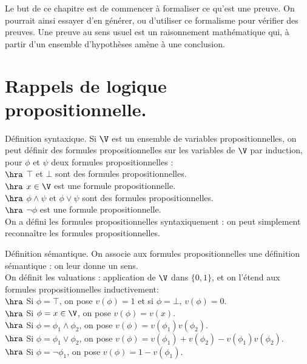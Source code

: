 \documentclass[french, 11pt]{article}
\begin{document}


Le but de ce chapitre est de commencer à formaliser ce qu'est une preuve. On pourrait ainsi essayer d'en générer, ou d'utiliser ce formalisme pour vérifier des preuves. Une preuve au sens usuel est un raisonnement mathématique qui, à partir d'un ensemble d'hypothèses amène à une conclusion. 

\section{Rappels de logique propositionnelle.}

\begin{rappel}{Définition syntaxique.}{}
    Si $\V$ est un ensemble de variables propositionnelles, on peut définir des formules propositionnelles sur les variables de $\V$ par induction, pour $\phi$ et $\psi$ deux formules propositionnelles :\\
    $\hra$ $\top$ et $\bot$ sont des formules propositionnelles.\\
    $\hra$ $x\in\V$ est une formule propositionnelle.\\
    $\hra$ $\phi \land \psi$ et $\phi \lor \psi$ sont des formules propositionnelles.\\
    $\hra$ $\lnot\phi$ est une formule propositionnelle.\\
    On a défini les formules propositionnelles syntaxiquement : on peut simplement reconnaître les formules propositionnelles.
\end{rappel}

\vspace*{-0.9cm}

\begin{rappel}{Définition sémantique.}{}
    On associe aux formules propositionnelles une définition sémantique : on leur donne un sens.\\
    On définit les valuations : application de $\V$ dans $\{0,1\}$, et on l'étend aux formules propositionnelles inductivement:\\
    $\hra$ Si $\phi=\top$, on pose $v(\phi)=1$ et si $\phi=\bot$, $v(\phi)=0$.\\
    $\hra$ Si $\phi=x\in\V$, on pose $v(\phi)=v(x)$.\\
    $\hra$ Si $\phi=\phi_1\land\phi_2$, on pose $v(\phi)= v(\phi_1)v(\phi_2)$.\\
    $\hra$ Si $\phi=\phi_1\lor\phi_2$, on pose $v(\phi)=v(\phi_1)+v(\phi_2) - v(\phi_1)v(\phi_2)$.\\
    $\hra$ Si $\phi=\lnot\phi_1$, on pose $v(\phi) = 1 - v(\phi_1)$.
\end{rappel}
\end{document}
